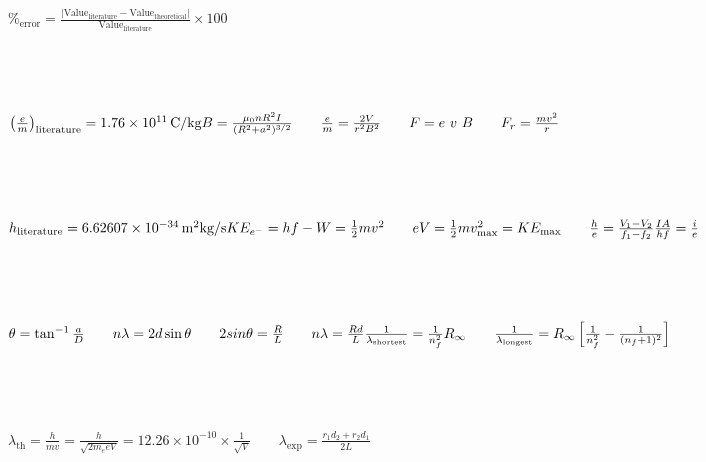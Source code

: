\documentclass[a4paper,12pt]{article}
\begin{document}

\fontsize{16}{20}\selectfont


\noindent
$\%_\text{error} = \frac{\lvert \text{Value}_{\text{literature}} - \text{Value}_{\text{theoretical}} \rvert}{\text{Value}_{\text{literature}}} \times 100$

{\ \\[-.7em] \centering \hdashrule{10cm}{0.4pt}{4pt} \par \ \\[-.7em]}

\noindent
$
\left( \frac{e}{m} \right)_{\text{literature}} = 1.76 \times 10^{11} \, \text{C/kg} \\[+1em]
B = \frac{\mu_0 n R^2 I}{(R^2 + a^2)^{3/2}} \qquad \frac{e}{m} = \frac{2V}{r^2 B^2} \qquad F = e~v~B \qquad F_r = \frac{mv^2}{r}
$

{\ \\[-.7em] \centering \hdashrule{10cm}{0.4pt}{4pt} \par \ \\[-.7em]}

\noindent
$
h_{\text{literature}} = 6.62607 \times 10^{-34} \, \text{m}^2 \text{kg/s}\\[+1em]
KE_{e^-} = hf - W = \frac{1}{2} mv^2 \qquad eV = \frac{1}{2} mv^2_{\text{max}} = KE_{\text{max}} \qquad \frac{h}{e} = \frac{V_1 - V_2}{f_1 - f_2}\\[+1em]
\frac{IA}{hf} = \frac{i}{e}
$

{\ \\[-.7em] \centering \hdashrule{10cm}{0.4pt}{4pt} \par \ \\[-.7em]}

\noindent
$
\theta = \tan^{-1}{\frac{a}{D}} \qquad n\lambda = 2d\sin{\theta} \qquad 2sin{\theta} = \frac{R}{L} \qquad n\lambda = \frac{Rd}{L} \\[+1em]
\frac{1}{\lambda_{\text{shortest}}} = \frac{1}{n_f^2} R_{\infty} \qquad \frac{1}{\lambda_{\text{longest}}} = R_{\infty} \left[\frac{1}{n_f^2} - \frac{1}{(n_f + 1)^2}\right]
$

{\ \\[-.7em] \centering \hdashrule{10cm}{0.4pt}{4pt} \par \ \\[-.7em]}

\noindent
$
\lambda_{\text{th}} = \frac{h}{mv} = \frac{h}{\sqrt{2m_e e V}} = 12.26 \times 10^{-10} \times \frac{1}{\sqrt{V}} \qquad \lambda_{\text{exp}} = \frac{r_1 d_2 + r_2 d_1}{2L}
$
\end{document}
